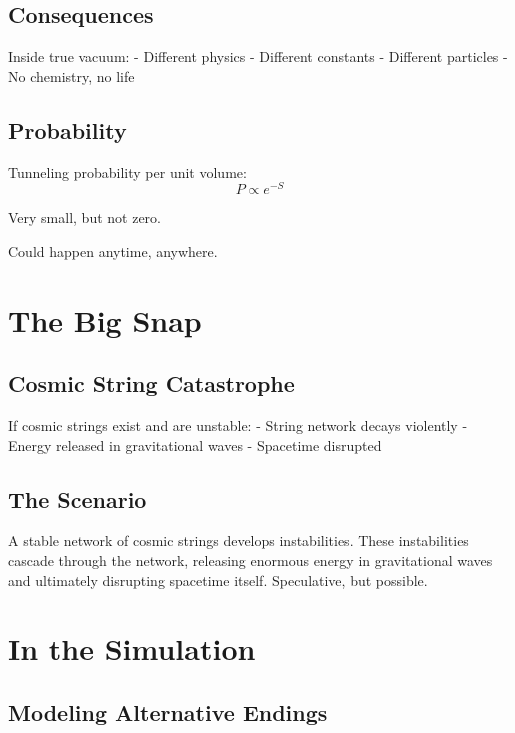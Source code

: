 \documentclass[
  11pt,
  letterpaper,
  twoside,
  openright]{book}
\begin{document}
\subsection{Consequences}\label{consequences-1}

Inside true vacuum: - Different physics - Different constants -
Different particles - No chemistry, no life

\subsection{Probability}\label{probability}

Tunneling probability per unit volume: \[
P \propto e^{-S}
\]

Very small, but not zero.

Could happen anytime, anywhere.

\section{The Big Snap}\label{the-big-snap}

\subsection{Cosmic String Catastrophe}\label{cosmic-string-catastrophe}

If cosmic strings exist and are unstable: - String network decays
violently - Energy released in gravitational waves - Spacetime disrupted

\subsection{The Scenario}\label{the-scenario}

A stable network of cosmic strings develops instabilities. These
instabilities cascade through the network, releasing enormous energy in
gravitational waves and ultimately disrupting spacetime itself.
Speculative, but possible.

\section{In the Simulation}\label{in-the-simulation-3}

\subsection{Modeling Alternative
Endings}\label{modeling-alternative-endings}
\end{document}
